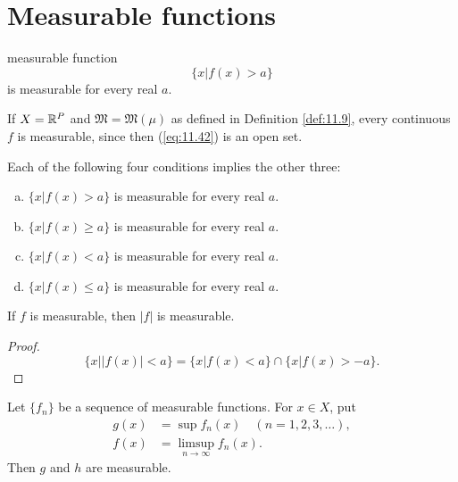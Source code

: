 
\section{Measurable functions}

\begin{mydef}
    \label{def:11.13}
    measurable function
    \begin{equation}
        \label{eq:11.42}
        \{x|f(x) > a\}
    \end{equation}
    is measurable for every real $a$.
\end{mydef}

\begin{myExample}
    If $X = {\protect\mathbb R}^P$ and $\mathfrak{M} = \mathfrak{M}(\mu)$ 
    as defined in Definition \ref{def:11.9}, every continuous $f$ is measurable, since then (\ref{eq:11.42}) is an open set.
\end{myExample}

\begin{thm}
    \label{thm:11.15}
    Each of the following four conditions implies the other three:
    \begin{enumerate}[(a)]
        \item $\{x|f(x) >    a\}$ is measurable for every real $a$.
        \item $\{x|f(x) \geq a\}$ is measurable for every real $a$.
        \item $\{x|f(x) <    a\}$ is measurable for every real $a$.
        \item $\{x|f(x) \leq a\}$ is measurable for every real $a$.
    \end{enumerate}
\end{thm}

\begin{thm}
    \label{thm:11.16}
    If $f$ is measurable, then $\left| f \right|$ is measurable. 
\end{thm}

\begin{proof}
    \begin{equation*}
        \{x | \left| f(x) \right| < a\} = 
        \{x | f(x) <  a\} \cap 
        \{x | f(x) > -a\} .
    \end{equation*}
\end{proof}

\begin{thm}
    \label{thm:11.17}
    Let $\{f_n\}$ be a sequence of measurable functions. 
    For $x \in X$, put
    \begin{align*}
        g(x) &= \sup f_n(x) \quad (n=1,2,3,\dots), \\
        f(x) &= \limsup_{n \rightarrow \infty} f_n (x) .
    \end{align*}
    Then $g$ and $h$ are measurable.
\end{thm}

